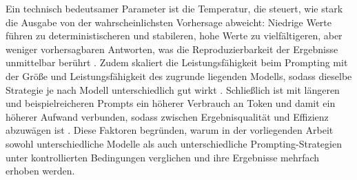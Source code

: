 Ein technisch bedeutsamer Parameter ist die Temperatur, die steuert, wie stark die Ausgabe von der wahrscheinlichsten Vorhersage abweicht: Niedrige Werte führen zu deterministischeren und stabileren, hohe Werte zu vielfältigeren, aber weniger vorhersagbaren Antworten, was die Reproduzierbarkeit der Ergebnisse unmittelbar berührt \autocite{schulhoffPromptReportSystematic2025,zhaoSurveyLargeLanguage2026}. Zudem skaliert die Leistungsfähigkeit beim Prompting mit der Größe und Leistungsfähigkeit des zugrunde liegenden Modells, sodass dieselbe Strategie je nach Modell unterschiedlich gut wirkt \autocite{liuPretrainPromptPredict2023,schulhoffPromptReportSystematic2025}. Schließlich ist mit längeren und beispielreicheren Prompts ein höherer Verbrauch an Token und damit ein höherer Aufwand verbunden, sodass zwischen Ergebnisqualität und Effizienz abzuwägen ist \autocite{changEfficientPromptingMethods2024,schulhoffPromptReportSystematic2025}. Diese Faktoren begründen, warum in der vorliegenden Arbeit sowohl unterschiedliche Modelle als auch unterschiedliche Prompting-Strategien unter kontrollierten Bedingungen verglichen und ihre Ergebnisse mehrfach erhoben werden.
